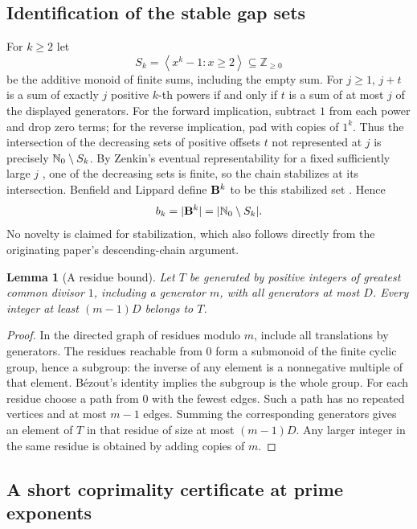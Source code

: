 \documentclass[11pt,a4paper]{article}
\newtheorem{SourceRbiKlemma}[SourceRbiKtheorem]{Lemma}
\begin{document}
\subsection{Identification of the stable gap sets}

For \(k\ge2\) let
\[
 S_k=\left\langle x^k-1:x\ge2\right\rangle
 \subseteq\mathbb Z_{\ge0}
\]
be the additive monoid of finite sums, including the empty sum.
For \(j\ge1\), \(j+t\) is a sum of exactly \(j\) positive \(k\)-th
powers if and only if \(t\) is a sum of at most \(j\) of the displayed
generators. For the forward implication, subtract \(1\) from each
power and drop zero terms; for the reverse implication, pad with
copies of \(1^k\). Thus the intersection of the decreasing sets of
positive offsets \(t\) not represented at \(j\) is precisely
\(\mathbb N_0\setminus S_k\). By Zenkin's eventual representability for a
fixed sufficiently large \(j\) \cite{R18K:Zenkin}\cite[Theorem~1.1]{R18K:BL}, one of the
decreasing sets is finite, so the chain stabilizes at its
intersection. Benfield and Lippard define \(\mathbf B^k\) to be this
stabilized set \cite[\S10.2]{R18K:BL}. Hence
\[
 b_k=|\mathbf B^k|=|\mathbb N_0\setminus S_k|.
\]
No novelty is claimed for stabilization, which also follows directly
from the originating paper's descending-chain argument.

\begin{SourceRbiKlemma}[A residue bound]\label{R18K:lem:residue}
Let \(T\) be generated by positive integers of greatest common divisor
\(1\), including a generator \(m\), with all generators at most \(D\).
Every integer at least \((m-1)D\) belongs to \(T\).
\end{SourceRbiKlemma}

\begin{proof}
In the directed graph of residues modulo \(m\), include all
translations by generators. The residues reachable from \(0\) form a
submonoid of the finite cyclic group, hence a subgroup: the inverse of
any element is a nonnegative multiple of that element.
B\'ezout's identity implies the subgroup is the whole group.
For each residue choose a path from \(0\) with the fewest edges.
Such a path has no repeated vertices and at most \(m-1\) edges.
Summing the corresponding generators gives an element of \(T\) in that
residue of size at most \((m-1)D\). Any larger integer in the same
residue is obtained by adding copies of \(m\).
\end{proof}

\subsection{A short coprimality certificate at prime exponents}
\end{document}
